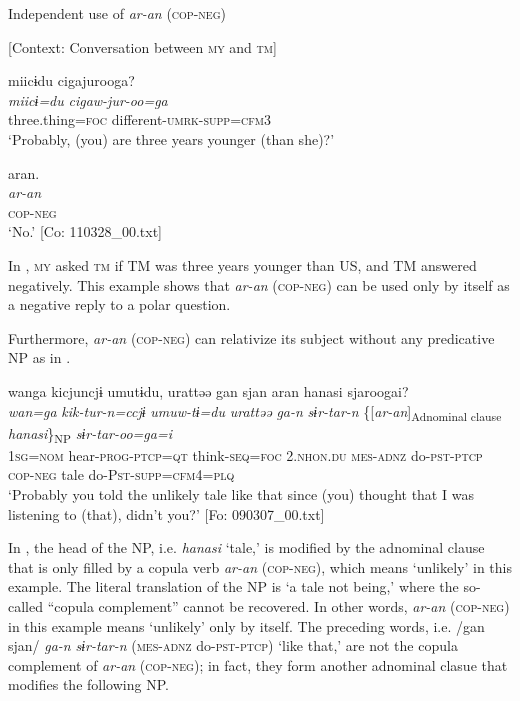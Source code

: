 \ea\label{ex:8-40}
  Independent use of \textit{ar-an} (\textsc{cop}-\textsc{neg})

  [Context: Conversation between \textsc{my} and \textsc{tm}]

{\MY}
\glll  miicɨdu  cigajurooga?\\
    \textit{miicɨ=du}  \textit{cigaw-jur-oo=ga}\\
    three.thing=\textsc{foc}  different-\textsc{umrk}-\textsc{supp}=\textsc{cfm3}\\
\glt ‘Probably, (you) are three years younger (than she)?’

  {\TM}
\glll  aran.\\
\textit{ar-an}\\
    \textsc{cop}-\textsc{neg}\\
\glt ‘No.’ [Co: 110328\_00.txt]
\z
\z

In , \textsc{my} asked \textsc{tm} if TM was three years younger than US, and TM answered negatively. This example shows that \textit{ar-an} (\textsc{cop}-\textsc{neg}) can be used only by itself as a negative reply to a polar question.

  Furthermore, \textit{ar-an} (\textsc{cop}-\textsc{neg}) can relativize its subject without any predicative NP as in .

\ea\label{ex:8-41}
  {\TM}
\glll  wanga  kicjuncjɨ  umutɨdu,  urattəə   gan  sjan  aran  hanasi  sjaroogai?\\
\textit{wan=ga}  \textit{kik-tur-n=ccjɨ}  \textit{umuw-tɨ=du}  \textit{urattəə}   \textit{ga-n}  \textit{sɨr-tar-n}  \{[\textit{ar-an}]\textsubscript{Adnominal clause}  \textit{hanasi}\}\textsubscript{NP}  \textit{sɨr-tar-oo=ga=i}\\
    1\textsc{sg}=\textsc{nom}  hear-\textsc{prog}-\textsc{ptcp}=\textsc{qt}  think-\textsc{seq}=\textsc{foc}  2.\textsc{nhon}.\textsc{du}  \textsc{mes}-\textsc{adnz}  do-\textsc{pst}-\textsc{ptcp}  \textsc{cop}-\textsc{neg}  tale  do-P\textsc{st}-\textsc{supp}=\textsc{cfm}4=\textsc{plq}\\
\glt ‘Probably you told the unlikely tale like that since (you) thought that I was listening to (that), didn’t you?’ [Fo: 090307\_00.txt]
\z

In , the head of the NP, i.e. \textit{hanasi} ‘tale,’ is modified by the adnominal clause that is only filled by a copula verb \textit{ar-an} (\textsc{cop}-\textsc{neg}), which means ‘unlikely’ in this example. The literal translation of the NP is ‘a tale not being,’ where the so-called “copula complement” cannot be recovered. In other words, \textit{ar-an} (\textsc{cop}-\textsc{neg}) in this example means ‘unlikely’ only by itself. The preceding words, i.e. /gan sjan/ \textit{ga-n} \textit{sɨr-tar-n} (\textsc{mes}-\textsc{adnz} do-\textsc{pst}-\textsc{ptcp}) ‘like that,’ are not the copula complement of \textit{ar-an} (\textsc{cop}-\textsc{neg}); in fact, they form another adnominal clasue that modifies the following NP.

